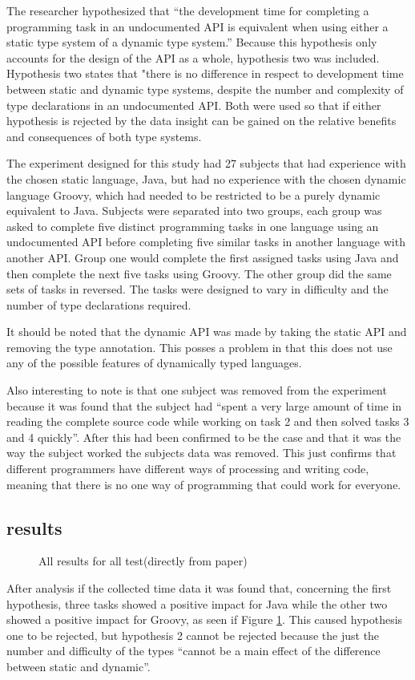 \documentclass{sig-alternate}
\begin{document}
The researcher hypothesized that ``the development time for completing a programming task in an undocumented API is equivalent when using either a static type system of a dynamic type system.''\cite{Mayer2012} Because this hypothesis only accounts for the design of the API as a whole, hypothesis two was included. Hypothesis two states that "there is no difference in respect to development time between static and dynamic type systems, despite the number and complexity of type declarations in an undocumented API. Both were used so that if either hypothesis is rejected by the data insight can be gained on the relative benefits and consequences of both type systems. 

The experiment designed for this study had 27 subjects that had  experience with the chosen static language, Java, but had no experience with the chosen dynamic language Groovy, which had needed to be restricted to be a purely dynamic equivalent to Java. Subjects were separated into two groups, each group was asked to complete five distinct programming tasks in one language using an undocumented API before completing five similar tasks in another language with another API. Group one would complete the first assigned tasks using Java and then complete the next five tasks using Groovy. The other group did the same sets of tasks in reversed. The tasks were designed to vary in difficulty and the number of type declarations required.

It should be noted that the dynamic API was made by taking the static API and removing the type annotation. This posses a problem in that this does not use any of the possible features of dynamically typed languages. 

Also interesting to note is that one subject was removed from the experiment because it was found that the subject had ``spent a very large amount of time in reading the complete source code while working on task 2 and then solved tasks 3 and 4 quickly''\cite{Mayer2012}. After this had been confirmed to be the case and that it was the way the subject worked the subjects data was removed. This just confirms that different programmers have different ways of processing and writing code, meaning that there is no one way of programming that could work for everyone. 

\subsection{results}
\begin{figure}
\centering
{}
\caption{All results for all test(directly from paper)\cite{Mayer2012}}
\label{influenceResults}
\end{figure}
After analysis if the collected time data it was found that, concerning the first hypothesis, three tasks showed a positive impact for Java while the other two showed a positive impact for Groovy, as seen if Figure \ref{influenceResults}. This caused hypothesis one to be rejected, but hypothesis 2 cannot be rejected because the just the number and difficulty of the types ``cannot be a main effect of the difference between static and dynamic''\cite{Mayer2012}.
\end{document}

